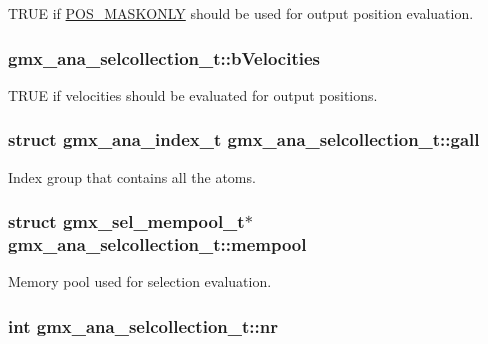 \-T\-R\-U\-E if \hyperlink{share_2template_2gromacs_2poscalc_8h_a3586daeaab8b4ff970ae759b3677e7fd}{\-P\-O\-S\-\_\-\-M\-A\-S\-K\-O\-N\-L\-Y} should be used for output position evaluation. \hypertarget{structgmx__ana__selcollection__t_a5d79f1787409dbc3cd24fadfe3d8f90f}{
\subsubsection[{b\-Velocities}]{ {\bf gmx\-\_\-ana\-\_\-selcollection\-\_\-t\-::b\-Velocities}}}\label{structgmx__ana__selcollection__t_a5d79f1787409dbc3cd24fadfe3d8f90f}
\-T\-R\-U\-E if velocities should be evaluated for output positions. \hypertarget{structgmx__ana__selcollection__t_ab395dd9b3cbd0c938096c73b1aed3dea}{
\subsubsection[{gall}]{\setlength{\rightskip}{0pt plus 5cm}struct {\bf gmx\-\_\-ana\-\_\-index\-\_\-t} {\bf gmx\-\_\-ana\-\_\-selcollection\-\_\-t\-::gall}}}\label{structgmx__ana__selcollection__t_ab395dd9b3cbd0c938096c73b1aed3dea}
\-Index group that contains all the atoms. \hypertarget{structgmx__ana__selcollection__t_ab4448df8389544f331a757c675b151d7}{
\subsubsection[{mempool}]{\setlength{\rightskip}{0pt plus 5cm}struct {\bf gmx\-\_\-sel\-\_\-mempool\-\_\-t}$\ast$ {\bf gmx\-\_\-ana\-\_\-selcollection\-\_\-t\-::mempool}}}\label{structgmx__ana__selcollection__t_ab4448df8389544f331a757c675b151d7}
\-Memory pool used for selection evaluation. \hypertarget{structgmx__ana__selcollection__t_a7841df40deda421c369a1905042c685a}{
\subsubsection[{nr}]{\setlength{\rightskip}{0pt plus 5cm}int {\bf gmx\-\_\-ana\-\_\-selcollection\-\_\-t\-::nr}}}\label{structgmx__ana__selcollection__t_a7841df40deda421c369a1905042c685a}
